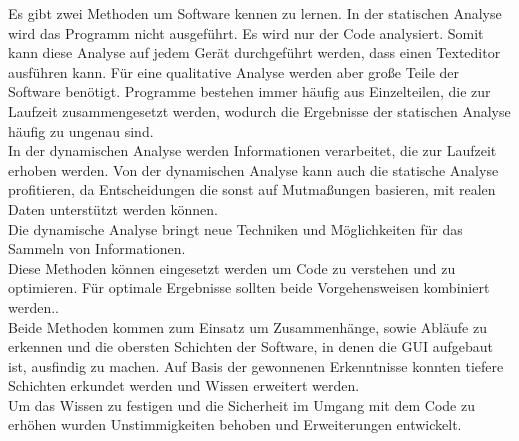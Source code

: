 \documentclass[12pt,a4paper]{article}
\begin{document}
Es gibt zwei Methoden um Software kennen zu lernen. In der statischen Analyse wird das Programm nicht ausgeführt. Es wird nur der Code analysiert\cite{mock2003dynamic}. Somit kann diese Analyse auf jedem Gerät durchgeführt werden, dass einen Texteditor ausführen kann. Für eine qualitative Analyse werden aber große Teile der Software benötigt. Programme bestehen immer häufig aus Einzelteilen, die zur Laufzeit zusammengesetzt werden, wodurch die Ergebnisse der statischen Analyse häufig zu ungenau sind\cite{mock2003dynamic}.\\
In der dynamischen Analyse werden Informationen verarbeitet, die zur Laufzeit erhoben werden. Von der dynamischen Analyse kann auch die statische Analyse profitieren, da Entscheidungen die sonst auf Mutmaßungen basieren, mit realen Daten unterstützt werden können\cite{mock2003dynamic}.\\
Die dynamische Analyse bringt neue Techniken und Möglichkeiten für das Sammeln von Informationen\cite{mock2003dynamic}.\\
Diese Methoden können eingesetzt werden um Code zu verstehen und zu optimieren. Für optimale Ergebnisse sollten beide Vorgehensweisen kombiniert werden.\cite{mock2003dynamic}.\\
Beide Methoden kommen zum Einsatz um Zusammenhänge, sowie Abläufe zu erkennen und die obersten Schichten der Software, in denen die \ac{GUI} aufgebaut ist, ausfindig zu machen. Auf Basis der gewonnenen Erkenntnisse konnten tiefere Schichten erkundet werden und Wissen erweitert werden.\\
Um das Wissen zu festigen und die Sicherheit im Umgang mit dem Code zu erhöhen wurden Unstimmigkeiten behoben und Erweiterungen entwickelt. \\


\newpage


\end{document}
